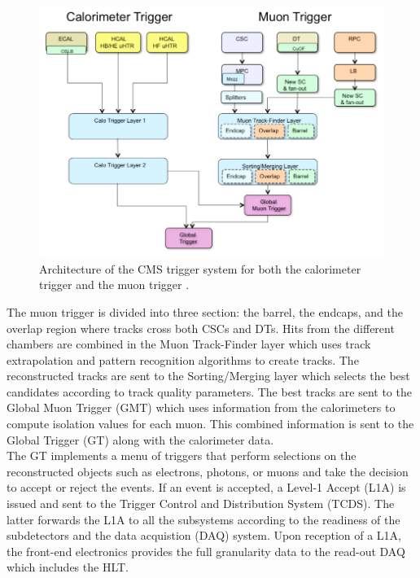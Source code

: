     \begin{figure}[h!]
      \centering
      \includegraphics[width=\textwidth]{img/I-3-cms/l1.png}
      \caption{Architecture of the CMS trigger system for both the calorimeter trigger and the muon trigger \cite{1748-0221-3-08-S08004}.}
      \label{fig:I-3-l1}
    \end{figure}

    The muon trigger is divided into three section: the barrel, the endcaps, and the overlap region where tracks cross both CSCs and DTs. Hits from the different chambers are combined in the Muon Track-Finder layer which uses track extrapolation and pattern recognition algorithms to create tracks. The reconstructed tracks are sent to the Sorting/Merging layer which selects the best candidates according to track quality parameters. The best tracks are sent to the Global Muon Trigger (GMT) which uses information from the calorimeters to compute isolation values for each muon. This combined information is sent to the Global Trigger (GT) along with the calorimeter data. \\

    The GT implements a menu of triggers that perform selections on the reconstructed objects such as electrons, photons, or muons and take the decision to accept or reject the events. If an event is accepted, a Level-1 Accept (L1A) is issued and sent to the Trigger Control and Distribution System (TCDS). The latter forwards the L1A to all the subsystems according to the readiness of the subdetectors and the data acquistion (DAQ) system. Upon reception of a L1A, the front-end electronics provides the full granularity data to the read-out DAQ which includes the HLT.


